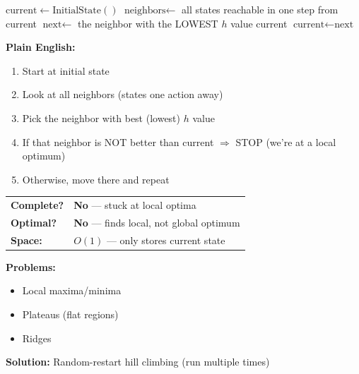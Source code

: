\documentclass[11pt,a4paper]{article}
\begin{document}
\begin{examplebox}
\begin{algorithmic}
\STATE $\text{current} \gets \text{InitialState}()$ 
 
    \STATE $\text{neighbors} \gets$ all states reachable in one step from current
    \STATE $\text{next} \gets$ the neighbor with the LOWEST $h$ value
     
        \RETURN current 
    \ENDIF
    \STATE $\text{current} \gets \text{next}$ 
\ENDWHILE
\end{algorithmic}

\textbf{Plain English:}
\begin{enumerate}[leftmargin=*,nosep]
\item Start at initial state
\item Look at all neighbors (states one action away)
\item Pick the neighbor with best (lowest) $h$ value
\item If that neighbor is NOT better than current $\Rightarrow$ STOP (we're at a local optimum)
\item Otherwise, move there and repeat
\end{enumerate}
\end{examplebox}

\begin{warningbox}
\begin{tabular}{@{}ll@{}}
\textbf{Complete?} & \textbf{No} --- stuck at local optima \\
\textbf{Optimal?} & \textbf{No} --- finds local, not global optimum \\
\textbf{Space:} & $O(1)$ --- only stores current state \\
\end{tabular}

\textbf{Problems:}
\begin{itemize}[leftmargin=*,nosep]
\item Local maxima/minima
\item Plateaus (flat regions)
\item Ridges
\end{itemize}

\textbf{Solution:} Random-restart hill climbing (run multiple times)
\end{warningbox}
\end{document}
